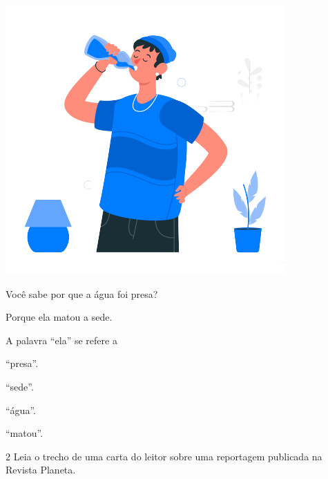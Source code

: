\begin{myquote}
\textit{}

\begin{center}
\includegraphics[width=\textwidth]{media/image55.png}
\end{center}

Você sabe por que a água foi presa?

Porque ela matou a sede.

\end{myquote}

A palavra ``ela'' se refere a

\begin{multicols}{2}
\begin{escolha}
\item ``presa''.

\item ``sede''.

\item ``água''.

\item ``matou''.
\end{escolha}
\end{multicols}
\pagebreak

\num{2} Leia o trecho de uma carta do leitor sobre uma reportagem
publicada na Revista Planeta.

